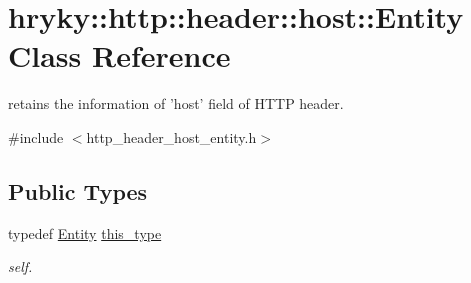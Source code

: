 \hypertarget{classhryky_1_1http_1_1header_1_1host_1_1_entity}{\section{hryky\-:\-:http\-:\-:header\-:\-:host\-:\-:Entity Class Reference}
\label{classhryky_1_1http_1_1header_1_1host_1_1_entity}
}


retains the information of 'host' field of H\-T\-T\-P header.  




{\ttfamily \#include $<$http\-\_\-header\-\_\-host\-\_\-entity.\-h$>$}

\subsection*{Public Types}
\begin{DoxyCompactItemize}
\item 
\hypertarget{classhryky_1_1http_1_1header_1_1host_1_1_entity_a28617ab18ca61481399d29706081946f}{typedef \hyperlink{classhryky_1_1http_1_1header_1_1host_1_1_entity}{Entity} \hyperlink{classhryky_1_1http_1_1header_1_1host_1_1_entity_a28617ab18ca61481399d29706081946f}{this\-\_\-type}}\label{classhryky_1_1http_1_1header_1_1host_1_1_entity_a28617ab18ca61481399d29706081946f}

\begin{DoxyCompactList}\small\item\em self. \end{DoxyCompactList}\end{DoxyCompactItemize}
